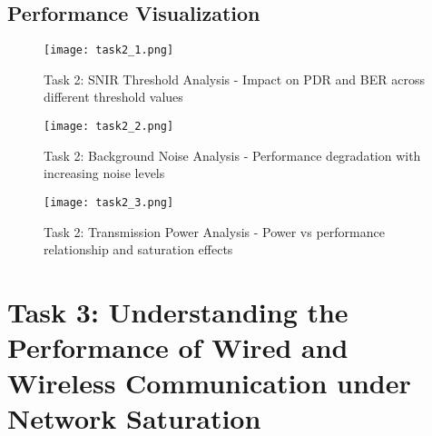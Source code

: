 \documentclass{article}
\begin{document}
\subsection{Performance Visualization}

\begin{figure}[H]

  \centering

  \texttt{[image: task2\_1.png]}

  \caption{Task 2: SNIR Threshold Analysis - Impact on PDR and BER across different threshold values}

  

\end{figure}

\begin{figure}[H]

  \centering

  \texttt{[image: task2\_2.png]}

  \caption{Task 2: Background Noise Analysis - Performance degradation with increasing noise levels}

 

\end{figure}

\begin{figure}[H]

  \centering

  \texttt{[image: task2\_3.png]}

  \caption{Task 2: Transmission Power Analysis - Power vs performance relationship and saturation effects}

  

\end{figure}





  


\newpage

\section{Task 3: Understanding the Performance of Wired and Wireless Communication under Network Saturation}
\end{document}
